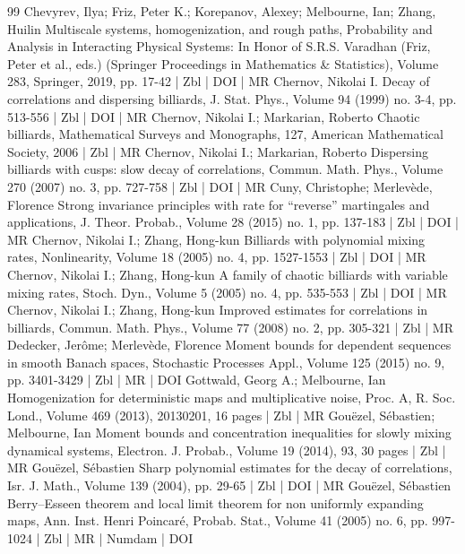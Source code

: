 \begin{thebibliography}{99}
Chevyrev, Ilya; Friz, Peter K.; Korepanov, Alexey; Melbourne, Ian; Zhang, Huilin Multiscale systems, homogenization, and rough paths, Probability and Analysis in Interacting Physical Systems: In Honor of S.R.S. Varadhan (Friz, Peter et al., eds.) (Springer Proceedings in Mathematics \& Statistics), Volume 283, Springer, 2019, pp. 17-42 | Zbl | DOI | MR
Chernov, Nikolai I. Decay of correlations and dispersing billiards, J. Stat. Phys., Volume 94 (1999) no. 3-4, pp. 513-556 | Zbl | DOI | MR
Chernov, Nikolai I.; Markarian, Roberto Chaotic billiards, Mathematical Surveys and Monographs, 127, American Mathematical Society, 2006 | Zbl | MR
Chernov, Nikolai I.; Markarian, Roberto Dispersing billiards with cusps: slow decay of correlations, Commun. Math. Phys., Volume 270 (2007) no. 3, pp. 727-758 | Zbl | DOI | MR
Cuny, Christophe; Merlevède, Florence Strong invariance principles with rate for “reverse” martingales and applications, J. Theor. Probab., Volume 28 (2015) no. 1, pp. 137-183 | Zbl | DOI | MR
Chernov, Nikolai I.; Zhang, Hong-kun Billiards with polynomial mixing rates, Nonlinearity, Volume 18 (2005) no. 4, pp. 1527-1553 | Zbl | DOI | MR
Chernov, Nikolai I.; Zhang, Hong-kun A family of chaotic billiards with variable mixing rates, Stoch. Dyn., Volume 5 (2005) no. 4, pp. 535-553 | Zbl | DOI | MR
Chernov, Nikolai I.; Zhang, Hong-kun Improved estimates for correlations in billiards, Commun. Math. Phys., Volume 77 (2008) no. 2, pp. 305-321 | Zbl | MR
Dedecker, Jerôme; Merlevède, Florence Moment bounds for dependent sequences in smooth Banach spaces, Stochastic Processes Appl., Volume 125 (2015) no. 9, pp. 3401-3429 | Zbl | MR | DOI
Gottwald, Georg A.; Melbourne, Ian Homogenization for deterministic maps and multiplicative noise, Proc. A, R. Soc. Lond., Volume 469 (2013), 20130201, 16 pages | Zbl | MR
Gouëzel, Sébastien; Melbourne, Ian Moment bounds and concentration inequalities for slowly mixing dynamical systems, Electron. J. Probab., Volume 19 (2014), 93, 30 pages | Zbl | MR
Gouëzel, Sébastien Sharp polynomial estimates for the decay of correlations, Isr. J. Math., Volume 139 (2004), pp. 29-65 | Zbl | DOI | MR
Gouëzel, Sébastien Berry–Esseen theorem and local limit theorem for non uniformly expanding maps, Ann. Inst. Henri Poincaré, Probab. Stat., Volume 41 (2005) no. 6, pp. 997-1024 | Zbl | MR | Numdam | DOI

\end{thebibliography}
